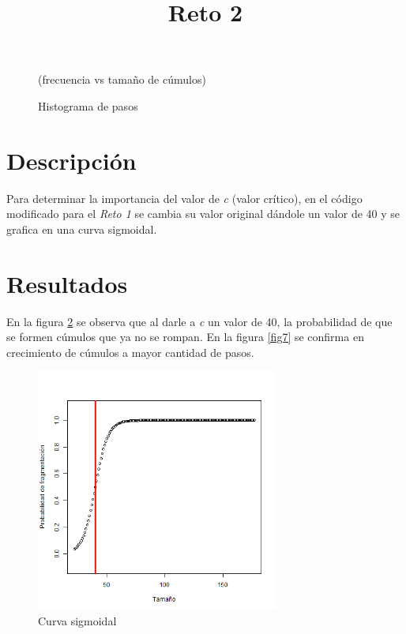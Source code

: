 \documentclass{article}
\begin{document}
\begin{figure}[h!]
\caption{Histograma de pasos} (frecuencia vs tamaño de cúmulos) \label{fig5}
\end{figure}
\newpage
\title{Reto 2}
\section{Descripción}
Para determinar la importancia del valor de \textit{c} (valor crítico), en el código modificado para el \textit{Reto 1} se cambia su valor original dándole un valor de 40 y se grafica en una curva sigmoidal.

\section{Resultados}
En la figura \ref{fig6} se observa que al darle a \textit{c} un valor de 40, la probabilidad de que se formen cúmulos que ya no se rompan. En la figura \ref{fig7} se confirma en crecimiento de cúmulos a mayor cantidad de pasos.

\begin{figure}[h!]
\centering\includegraphics[width=80mm]{c40sigm.png}
\caption{Curva sigmoidal}
\label{fig6}
\end{figure}
\end{document}

